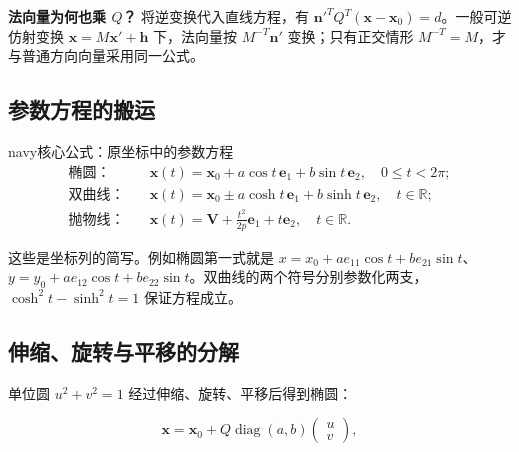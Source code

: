 \documentclass[11pt,a4paper]{article}
\begin{document}
\textbf{法向量为何也乘 \(Q\)？} 将逆变换代入直线方程，有
\(\boldsymbol n'^TQ^T(\boldsymbol x-\boldsymbol x_0)=d\)。一般可逆仿射变换
\(\boldsymbol x=M\boldsymbol x'+\boldsymbol h\) 下，法向量按
\(M^{-T}\boldsymbol n'\) 变换；只有正交情形
\(M^{-T}=M\)，才与普通方向向量采用同一公式。

\subsection{参数方程的搬运}\label{ux53c2ux6570ux65b9ux7a0bux7684ux642cux8fd0}

\begin{sboxenv}{navy}{核心公式：原坐标中的参数方程}
\begin{equation*}
\begin{aligned}\text{椭圆：}\quad &\boldsymbol x(t)=\boldsymbol x_0+a\cos t\,\boldsymbol e_1+b\sin t\,\boldsymbol e_2,\quad 0\le t<2\pi;\\ \text{双曲线：}\quad &\boldsymbol x(t)=\boldsymbol x_0\pm a\cosh t\,\boldsymbol e_1+b\sinh t\,\boldsymbol e_2,\quad t\in\mathbb R;\\ \text{抛物线：}\quad &\boldsymbol x(t)=\boldsymbol V+\frac{t^2}{2p}\boldsymbol e_1+t\boldsymbol e_2,\quad t\in\mathbb R.\end{aligned}\tag{6.1}
\end{equation*}

\end{sboxenv}

这些是坐标列的简写。例如椭圆第一式就是
\(x=x_0+a e_{11}\cos t+b e_{21}\sin t\)、\(y=y_0+a e_{12}\cos t+b e_{22}\sin t\)。双曲线的两个符号分别参数化两支，\(\cosh^2t-\sinh^2t=1\)
保证方程成立。

\subsection{伸缩、旋转与平移的分解}\label{ux4f38ux7f29ux65cbux8f6cux4e0eux5e73ux79fbux7684ux5206ux89e3}

单位圆 \(u^2+v^2=1\) 经过伸缩、旋转、平移后得到椭圆：

\begin{equation*}
\boldsymbol x=\boldsymbol x_0+Q\operatorname{diag}(a,b)\begin{pmatrix}u\\v\end{pmatrix},
\end{equation*}
\end{document}
